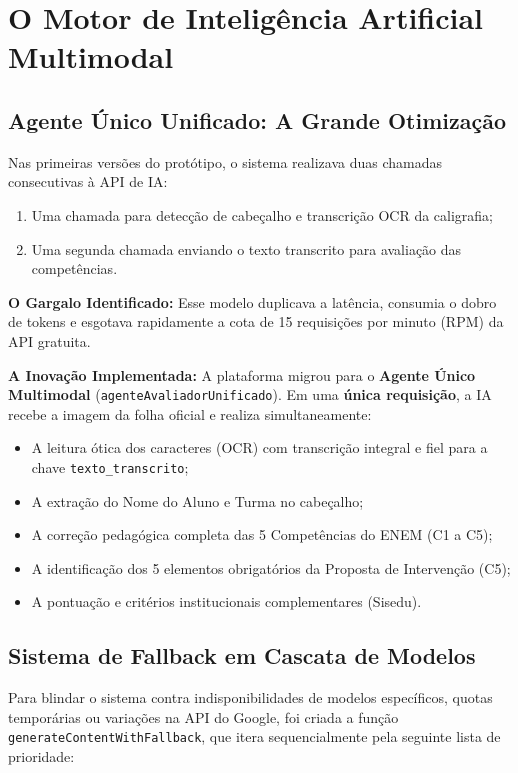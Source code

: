 \documentclass[11pt,a4paper]{article}
\begin{document}
\section{O Motor de Inteligência Artificial Multimodal}

\subsection{Agente Único Unificado: A Grande Otimização}
Nas primeiras versões do protótipo, o sistema realizava duas chamadas consecutivas à API de IA:
\begin{enumerate}
    \item Uma chamada para detecção de cabeçalho e transcrição OCR da caligrafia;
    \item Uma segunda chamada enviando o texto transcrito para avaliação das competências.
\end{enumerate}

\textbf{O Gargalo Identificado:} Esse modelo duplicava a latência, consumia o dobro de tokens e esgotava rapidamente a cota de 15 requisições por minuto (RPM) da API gratuita.

\textbf{A Inovação Implementada:} A plataforma migrou para o \textbf{Agente Único Multimodal} (\texttt{agenteAvaliadorUnificado}). Em uma \textbf{única requisição}, a IA recebe a imagem da folha oficial e realiza simultaneamente:
\begin{itemize}[leftmargin=1.5em]
    \item A leitura ótica dos caracteres (OCR) com transcrição integral e fiel para a chave \texttt{texto\_transcrito};
    \item A extração do Nome do Aluno e Turma no cabeçalho;
    \item A correção pedagógica completa das 5 Competências do ENEM (C1 a C5);
    \item A identificação dos 5 elementos obrigatórios da Proposta de Intervenção (C5);
    \item A pontuação e critérios institucionais complementares (Sisedu).
\end{itemize}

\subsection{Sistema de Fallback em Cascata de Modelos}
Para blindar o sistema contra indisponibilidades de modelos específicos, quotas temporárias ou variações na API do Google, foi criada a função \texttt{generateContentWithFallback}, que itera sequencialmente pela seguinte lista de prioridade:
\end{document}
